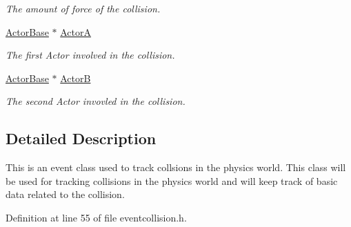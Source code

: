\begin{DoxyCompactItemize}
\begin{DoxyCompactList}\small\item\em The amount of force of the collision. \item\end{DoxyCompactList}\item 
\hypertarget{classphys_1_1EventCollision_a2de905d0332c66293cbe990fe2dbbb07}{
\hyperlink{classphys_1_1ActorBase}{ActorBase} $\ast$ \hyperlink{classphys_1_1EventCollision_a2de905d0332c66293cbe990fe2dbbb07}{ActorA}}
\label{dd/de9/classphys_1_1EventCollision_a2de905d0332c66293cbe990fe2dbbb07}

\begin{DoxyCompactList}\small\item\em The first Actor involved in the collision. \item\end{DoxyCompactList}\item 
\hypertarget{classphys_1_1EventCollision_a922fd42b74db6df7a59cb5fd54cbadbe}{
\hyperlink{classphys_1_1ActorBase}{ActorBase} $\ast$ \hyperlink{classphys_1_1EventCollision_a922fd42b74db6df7a59cb5fd54cbadbe}{ActorB}}
\label{dd/de9/classphys_1_1EventCollision_a922fd42b74db6df7a59cb5fd54cbadbe}

\begin{DoxyCompactList}\small\item\em The second Actor invovled in the collision. \item\end{DoxyCompactList}\end{DoxyCompactItemize}


\subsection{Detailed Description}
This is an event class used to track collsions in the physics world. This class will be used for tracking collisions in the physics world and will keep track of basic data related to the collision. 

Definition at line 55 of file eventcollision.h.



